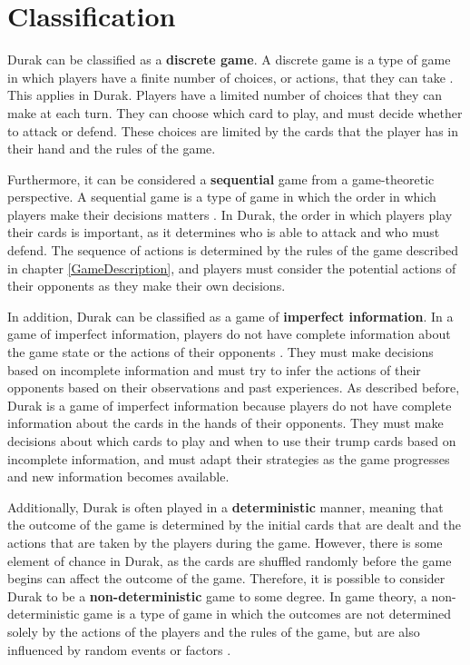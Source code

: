 \section{Classification}

Durak can be classified as a \textbf{discrete game}. A discrete game is a type of game in which players have a finite number of choices, or actions, that they can take \citep{Gametheory4}. This applies in Durak. Players have a limited number of choices that they can make at each turn. They can choose which card to play, and must decide whether to attack or defend. These choices are limited by the cards that the player has in their hand and the rules of the game. 

Furthermore, it can be considered a \textbf{sequential} game from a game-theoretic perspective. A sequential game is a type of game in which the order in which players make their decisions matters \citep{Gametheory4}. In Durak, the order in which players play their cards is important, as it determines who is able to attack and who must defend. The sequence of actions is determined by the rules of the game described in chapter \ref{GameDescription}, and players must consider the potential actions of their opponents as they make their own decisions. 

In addition, Durak can be classified as a game of \textbf{imperfect information}. In a game of imperfect information, players do not have complete information about the game state or the actions of their opponents \citep{Gametheory4}. They must make decisions based on incomplete information and must try to infer the actions of their opponents based on their observations and past experiences. As described before, Durak is a game of imperfect information because players do not have complete information about the cards in the hands of their opponents. They must make decisions about which cards to play and when to use their trump cards based on incomplete information, and must adapt their strategies as the game progresses and new information becomes available.

Additionally, Durak is often played in a \textbf{deterministic} manner, meaning that the outcome of the game is determined by the initial cards that are dealt and the actions that are taken by the players during the game. However, there is some element of chance in Durak, as the cards are shuffled randomly before the game begins can affect the outcome of the game. Therefore, it is possible to consider Durak to be a \textbf{non-deterministic} game to some degree. In game theory, a non-deterministic game is a type of game in which the outcomes are not determined solely by the actions of the players and the rules of the game, but are also influenced by random events or factors \citep{Gametheory4}. 

